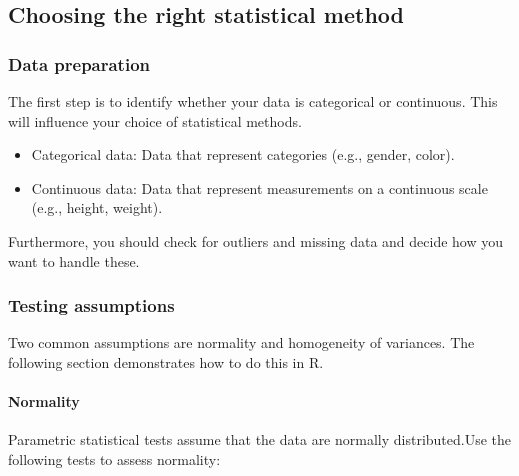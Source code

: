 \documentclass[
]{article}
\providecommand{\tightlist}{%
  \setlength{\itemsep}{0pt}\setlength{\parskip}{0pt}}
\begin{document}
\subsection{Choosing the right statistical
method}\label{choosing-the-right-statistical-method}

\subsubsection{Data preparation}\label{data-preparation}

The first step is to identify whether your data is categorical or
continuous. This will influence your choice of statistical methods.

\begin{itemize}
\tightlist
\item
  Categorical data: Data that represent categories (e.g., gender,
  color).
\item
  Continuous data: Data that represent measurements on a continuous
  scale (e.g., height, weight).
\end{itemize}

Furthermore, you should check for outliers and missing data and decide
how you want to handle these.

\subsubsection{Testing assumptions}\label{testing-assumptions}

Two common assumptions are normality and homogeneity of variances. The
following section demonstrates how to do this in R.

\paragraph{Normality}\label{normality}

Parametric statistical tests assume that the data are normally
distributed.Use the following tests to assess normality:
\end{document}

